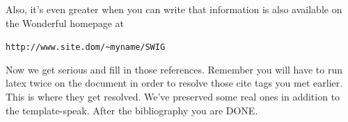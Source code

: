 \documentclass[letterpaper,twocolumn,10pt]{article}
\begin{document}
Also, it's even greater when you can write that information is also 
available on the Wonderful homepage at 

\begin{center}
{\tt http://www.site.dom/\~{}myname/SWIG}
\end{center}

Now we get serious and fill in those references.  Remember you will
have to run latex twice on the document in order to resolve those
cite tags you met earlier.  This is where they get resolved.
We've preserved some real ones in addition to the template-speak.
After the bibliography you are DONE.

{\footnotesize 
}


\theendnotes
\end{document}
